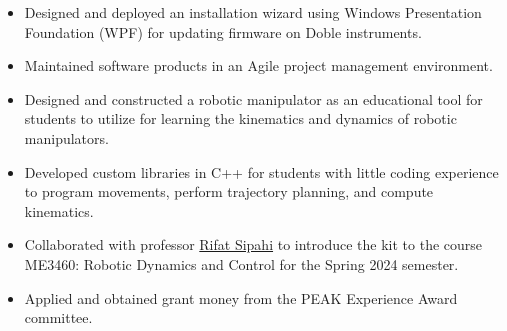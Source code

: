 \documentclass[10pt,a4paper,ragged2e,withhyper]{altacv}
\begin{document}
\begin{paracol}{2}
\begin{itemize}
        \item Designed and deployed an installation wizard using Windows Presentation Foundation (WPF) for updating firmware on Doble instruments.
        \item Maintained software products in an Agile project management environment.
    \end{itemize}
    \begin{itemize}
        \item Designed and constructed a robotic manipulator as an educational tool for students to utilize for learning the kinematics and dynamics of robotic manipulators.
        \item Developed custom libraries in C++ for students with little coding experience to program movements, perform trajectory planning, and compute kinematics.
        \item Collaborated with professor \href{https://coe.northeastern.edu/people/sipahi-rifat/}{Rifat Sipahi} to introduce the kit to the course ME3460: Robotic Dynamics and Control for the Spring 2024 semester.
        \item Applied and obtained grant money from the PEAK Experience Award committee.
    \end{itemize}


\end{paracol}
\end{document}

